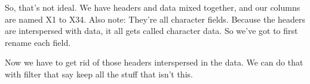 \documentclass[]{book}
\newenvironment{Shaded}{\begin{snugshade}}{\end{snugshade}}
\newcommand{\KeywordTok}[1]{\textcolor[rgb]{0.13,0.29,0.53}{\textbf{#1}}}
\newcommand{\DataTypeTok}[1]{\textcolor[rgb]{0.13,0.29,0.53}{#1}}
\newcommand{\StringTok}[1]{\textcolor[rgb]{0.31,0.60,0.02}{#1}}
\newcommand{\OperatorTok}[1]{\textcolor[rgb]{0.81,0.36,0.00}{\textbf{#1}}}
\newcommand{\NormalTok}[1]{#1}
\begin{document}
So, that's not ideal. We have headers and data mixed together, and our
columns are named X1 to X34. Also note: They're all character fields.
Because the headers are interspersed with data, it all gets called
character data. So we've got to first rename each field.

\begin{Shaded}
\end{Shaded}

Now we have to get rid of those headers interspersed in the data. We can
do that with filter that say keep all the stuff that isn't this.

\begin{Shaded}
\end{Shaded}
\end{document}
